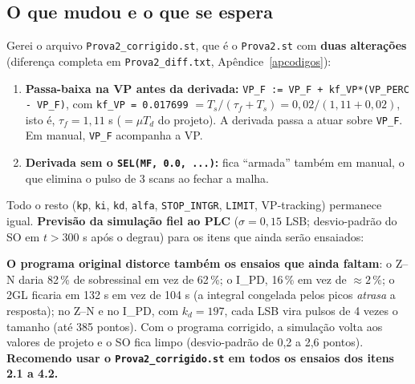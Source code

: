\subsection{O que mudou e o que se espera}
Gerei o arquivo \texttt{Prova2\_corrigido.st}, que é o \texttt{Prova2.st} com \textbf{duas alterações} (diferença completa em \texttt{Prova2\_diff.txt}, Apêndice~\ref{apcodigos}):
\begin{enumerate}
\item \textbf{Passa-baixa na VP antes da derivada:} \texttt{VP\_F := VP\_F + kf\_VP*(VP\_PERC - VP\_F)}, com \texttt{kf\_VP = 0.017699} $=T_s/(\tau_f+T_s)=0{,}02/(1{,}11+0{,}02)$, isto é, $\tau_f=1{,}11$ s ($=\mu T_d$ do projeto). A derivada passa a atuar sobre \texttt{VP\_F}. Em manual, \texttt{VP\_F} acompanha a VP.
\item \textbf{Derivada sem o \texttt{SEL(MF, 0.0, ...)}:} fica ``armada'' também em manual, o que elimina o pulso de 3 scans ao fechar a malha.
\end{enumerate}
Todo o resto (\texttt{kp}, \texttt{ki}, \texttt{kd}, \texttt{alfa}, \texttt{STOP\_INTGR}, \texttt{LIMIT}, VP-tracking) permanece igual. \textbf{Previsão da simulação fiel ao PLC} ($\sigma=0{,}15$ LSB; desvio-padrão do SO em $t>300$ s após o degrau) para os itens que ainda serão ensaiados:
\begin{center}\small{}\end{center}
\begin{res}\textbf{O programa original distorce também os ensaios que ainda faltam}: o Z--N daria 82\,\% de sobressinal em vez de 62\,\%; o I\_PD, 16\,\% em vez de $\approx2\,\%$; o 2GL ficaria em 132 s em vez de 104 s (a integral congelada pelos picos \emph{atrasa} a resposta); no Z--N e no I\_PD, com $k_d=197$, cada LSB vira pulsos de 4 vezes o tamanho (até 385 pontos). Com o programa corrigido, a simulação volta aos valores de projeto e o SO fica limpo (desvio-padrão de 0,2 a 2,6 pontos). \textbf{Recomendo usar o \texttt{Prova2\_corrigido.st} em todos os ensaios dos itens 2.1 a 4.2.}\end{res}
